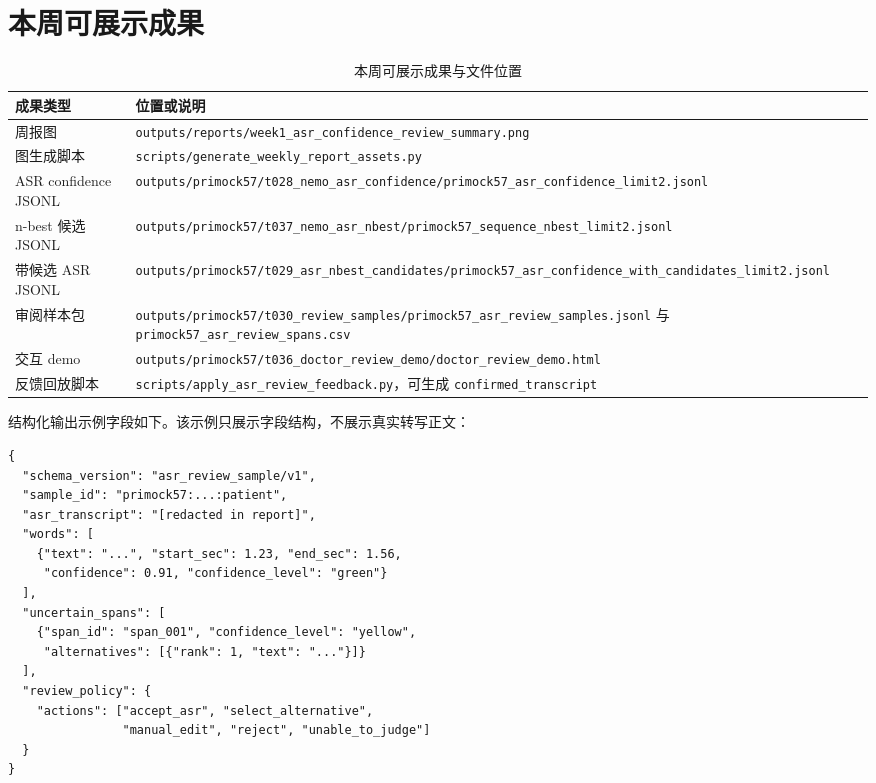 \documentclass[UTF8,a4paper,12pt]{ctexart}
\begin{document}
\section{本周可展示成果}

\begin{table}[H]
\centering
\small
\begin{tabularx}{\textwidth}{p{3.2cm}X}
\toprule
\textbf{成果类型} & \textbf{位置或说明} \\
\midrule
周报图 & \texttt{outputs/reports/week1\_asr\_confidence\_review\_summary.png} \\
图生成脚本 & \texttt{scripts/generate\_weekly\_report\_assets.py} \\
ASR confidence JSONL & \texttt{outputs/primock57/t028\_nemo\_asr\_confidence/primock57\_asr\_confidence\_limit2.jsonl} \\
n-best 候选 JSONL & \texttt{outputs/primock57/t037\_nemo\_asr\_nbest/primock57\_sequence\_nbest\_limit2.jsonl} \\
带候选 ASR JSONL & \texttt{outputs/primock57/t029\_asr\_nbest\_candidates/primock57\_asr\_confidence\_with\_candidates\_limit2.jsonl} \\
审阅样本包 & \texttt{outputs/primock57/t030\_review\_samples/primock57\_asr\_review\_samples.jsonl} 与 \texttt{primock57\_asr\_review\_spans.csv} \\
交互 demo & \texttt{outputs/primock57/t036\_doctor\_review\_demo/doctor\_review\_demo.html} \\
反馈回放脚本 & \texttt{scripts/apply\_asr\_review\_feedback.py}，可生成 \texttt{confirmed\_transcript} \\
\bottomrule
\end{tabularx}
\caption{本周可展示成果与文件位置}
\end{table}

结构化输出示例字段如下。该示例只展示字段结构，不展示真实转写正文：

\begin{verbatim}
{
  "schema_version": "asr_review_sample/v1",
  "sample_id": "primock57:...:patient",
  "asr_transcript": "[redacted in report]",
  "words": [
    {"text": "...", "start_sec": 1.23, "end_sec": 1.56,
     "confidence": 0.91, "confidence_level": "green"}
  ],
  "uncertain_spans": [
    {"span_id": "span_001", "confidence_level": "yellow",
     "alternatives": [{"rank": 1, "text": "..."}]}
  ],
  "review_policy": {
    "actions": ["accept_asr", "select_alternative",
                "manual_edit", "reject", "unable_to_judge"]
  }
}
\end{verbatim}
\end{document}
